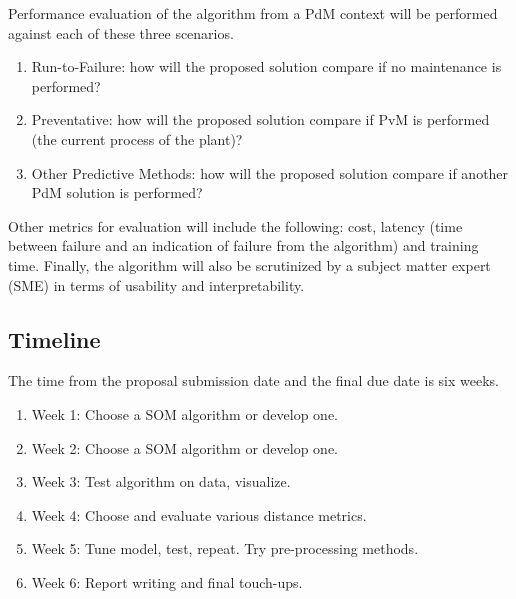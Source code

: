 Performance evaluation of the algorithm from a PdM context will be performed against each of these three scenarios.
\begin{enumerate}
    \item Run-to-Failure: how will the proposed solution compare if no maintenance is performed?
    \item Preventative: how will the proposed solution compare if PvM is performed (the current process of the plant)?
    \item Other Predictive Methods: how will the proposed solution compare if another PdM solution is performed?
\end{enumerate}

Other metrics for evaluation will include the following: cost, latency (time between failure and an indication of failure from the algorithm) and training time.
Finally, the algorithm will also be scrutinized by a subject matter expert (SME) in terms of usability and interpretability.


\subsection{Timeline}

The time from the proposal submission date and the final due date is six weeks.

\begin{enumerate}
	\item Week 1: Choose a SOM algorithm or develop one.
    \item Week 2: Choose a SOM algorithm or develop one.
    \item Week 3: Test algorithm on data, visualize.
    \item Week 4: Choose and evaluate various distance metrics.
    \item Week 5: Tune model, test, repeat. Try pre-processing methods.
    \item Week 6: Report writing and final touch-ups.
\end{enumerate}